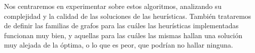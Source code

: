Nos centraremos en experimentar sobre estos algoritmos, analizando su complejidad y la calidad de las soluciones de las heur\'isticas. Tambi\'en trataremos de definir las familias de grafos para las cu\'ales las heur\'isticas implementadas funcionan muy bien, y aquellas para las cu\'ales las mismas hallan una soluci\'on muy alejada de la \'optima, o lo que es peor, que podr\'ian no hallar ninguna. 
